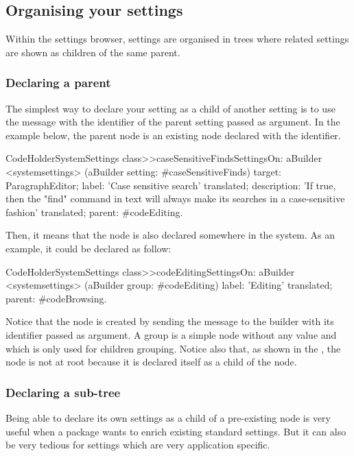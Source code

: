 \documentclass[a4paper,10pt,twoside]{book}
\begin{document}
\subsection{Organising your settings}

Within the settings browser, settings are organised in trees where related settings are shown as children of the same parent. 

\subsubsection{Declaring a parent}
The simplest way to declare your setting as a child of another setting is to use the  message with the identifier of the parent setting passed as argument. In the example below, the parent node is an existing node declared with the  identifier. 
\begin{code}{}
CodeHolderSystemSettings class>>caseSensitiveFindsSettingsOn: aBuilder
	<systemsettings>
	(aBuilder setting: #caseSensitiveFinds) 
		target: ParagraphEditor;
		label: 'Case sensitive search' translated;
		description: 'If true, then the "find" command in text will always make its searches in a case-sensitive fashion' translated;
		parent: #codeEditing.
\end{code}
Then, it means that the  node is also declared somewhere in the system. As an example, it could be declared as follow:
\begin{code}{}
CodeHolderSystemSettings class>>codeEditingSettingsOn: aBuilder
	<systemsettings>
	(aBuilder group: #codeEditing) 
		label: 'Editing' translated;
		parent: #codeBrowsing.
\end{code}
Notice that the  node is created by sending the  message to the builder with its identifier passed as argument. A group is a simple node without any value and which is only used for children grouping. Notice also that, as shown in the , the  node is not at root because it is declared itself as a child of the  node.

\subsubsection{Declaring a sub-tree}
Being able to declare its own settings as a child of a pre-existing node is very useful when a package wants to enrich existing standard settings. But it can also be very tedious for settings which are very application specific. 
\end{document}
